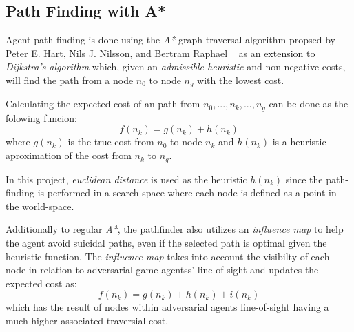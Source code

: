 \documentclass[a4paper, twocolumn]{article}
\begin{document}
        \subsection{Path Finding with A*} \label{sec:path_finding}

	Agent path finding is done using the \emph{A*} graph traversal algorithm propsed by Peter E. Hart, Nils J. Nilsson, and Bertram Raphael ~\cite{hart1968formal} as an extension to \emph{Dijkstra's algorithm} which, given an \emph{admissible heuristic} and non-negative costs, will find the path from a node \(n_0\) to node \(n_g\) with the lowest cost.
	
	Calculating the expected cost of an path from \(n_0,...,n_k,...,n_g\) can be done as the folowing funcion:
	\begin{equation*}
		f(n_k) = g(n_k) + h(n_k)
	\end{equation*}	
	where \(g(n_k)\) is the true cost from \(n_0\) to node \(n_k\) and \(h(n_k)\) is a heuristic aproximation of the cost from \(n_k\) to \(n_g\).

        In this project, \emph{euclidean distance} is used as the heuristic \(h(n_k)\) since the path-finding is performed in a search-space where each node is defined as a point in the world-space. 

	Additionally to regular \emph{A*}, the pathfinder also utilizes an \emph{influence map} to help the agent avoid suicidal paths, even if the selected path is optimal given the heuristic function. The \emph{influence map} takes into account the visibilty of each node in relation to adversarial game agentss' line-of-sight and updates the expected cost as:
	\begin{equation*}
		f(n_k) = g(n_k) + h(n_k) + i(n_k)
	\end{equation*} 
	which has the result of nodes within adversarial agents line-of-sight having a much higher associated traversial cost. 
	
\end{document}

